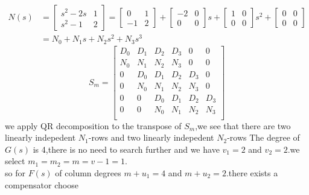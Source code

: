 \documentclass{article}
\begin{document}
\[
\begin{split}
N(s)& =\left[
    \begin{array}{cc}
        s^2-2s & 1\\
        s^2-1 & 2
    \end{array}
\right]=
\left[
    \begin{array}{cc}
        0 & 1\\
        -1 & 2
    \end{array}
\right]+
\left[
    \begin{array}{cc}
        -2 & 0\\
        0 & 0
    \end{array}
\right]s+
\left[
    \begin{array}{cc}
        1 & 0\\
        0 & 0
    \end{array}
\right]s^2+
\left[
    \begin{array}{cc}
        0 & 0\\
        0 & 0
    \end{array}
\right]
\\
& =N_0+N_1s+N_2s^2+N_3s^3
\end{split}
\]
\[
S_m=
    \left[ 
        \begin{array}{cccccc}
            D_0 & D_1 & D_2 & D_3 & 0 & 0\\
            N_0 & N_1 & N_2 & N_3 & 0& 0\\
            0 & D_0 & D_1 & D_2 & D_3 & 0\\
            0 & N_0 & N_1 & N_2 & N_3 & 0\\
            0 & 0 & D_0 & D_1 & D_2 & D_3\\
            0 & 0 & N_0 & N_1 & N_2 & N_3 \\
        \end{array}
    \right]     
\]
we apply QR decomposition to the transpose of $S_m$,we see that there are two linearly indepedent $N_1$-rows and two linearly indepedent $N_2$-rows
The degree of $G(s)$ is 4,there is no need to search further and we have $v_1=2$ and $v_2=2$.we select $m_1=m_2=m=v-1=1$.\\
so for $F(s)$ of column degrees $m+u_1=4$ and $m+u_2=2$.there exists a compensator
choose
\end{document}
